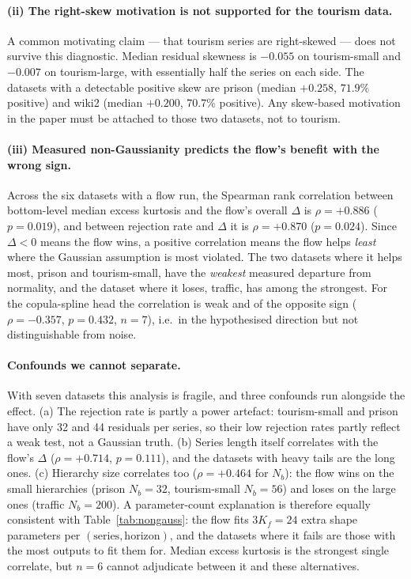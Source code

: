 \documentclass[11pt]{article}
\newcommand{\Nb}{N_{b}}
\begin{document}
\paragraph{(ii) The right-skew motivation is not supported for the tourism data.}
A common motivating claim --- that tourism series are right-skewed --- does not
survive this diagnostic. Median residual skewness is $-0.055$ on tourism-small and
$-0.007$ on tourism-large, with essentially half the series on each side. The
datasets with a detectable positive skew are prison (median $+0.258$, $71.9\%$
positive) and wiki2 (median $+0.200$, $70.7\%$ positive). Any skew-based motivation
in the paper must be attached to those two datasets, not to tourism.

\paragraph{(iii) Measured non-Gaussianity predicts the flow's benefit with the wrong
sign.} Across the six datasets with a flow run, the Spearman rank correlation between
bottom-level median excess kurtosis and the flow's overall $\Delta$ is
$\rho = +0.886$ ($p = 0.019$), and between rejection rate and $\Delta$ it is
$\rho = +0.870$ ($p = 0.024$). Since $\Delta < 0$ means the flow wins, a positive
correlation means the flow helps \emph{least} where the Gaussian assumption is most
violated. The two datasets where it helps most, prison and tourism-small, have the
\emph{weakest} measured departure from normality, and the dataset where it loses,
traffic, has among the strongest. For the copula-spline head the correlation is weak
and of the opposite sign ($\rho = -0.357$, $p = 0.432$, $n = 7$), i.e.\ in the
hypothesised direction but not distinguishable from noise.

\paragraph{Confounds we cannot separate.} With seven datasets this analysis is
fragile, and three confounds run alongside the effect. (a) The rejection rate is
partly a power artefact: tourism-small and prison have only 32 and 44 residuals per
series, so their low rejection rates partly reflect a weak test, not a Gaussian
truth. (b) Series length itself correlates with the flow's $\Delta$
($\rho = +0.714$, $p = 0.111$), and the datasets with heavy tails are the long ones.
(c) Hierarchy size correlates too ($\rho = +0.464$ for $\Nb$): the flow wins on the
small hierarchies (prison $\Nb{=}32$, tourism-small $\Nb{=}56$) and loses on the
large ones (traffic $\Nb{=}200$). A parameter-count explanation is therefore equally
consistent with Table~\ref{tab:nongauss}: the flow fits $3K_f = 24$ extra shape
parameters per $(\text{series}, \text{horizon})$, and the datasets where it fails are
those with the most outputs to fit them for. Median excess kurtosis is the strongest
single correlate, but $n=6$ cannot adjudicate between it and these alternatives.
\end{document}
